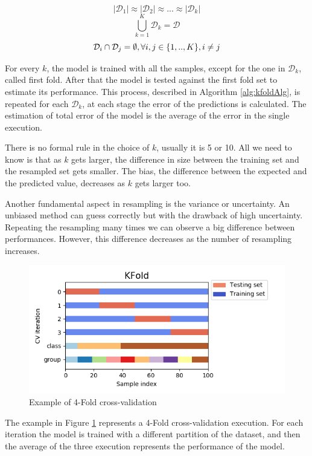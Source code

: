\[|\mathcal{D}_1| \approx |\mathcal{D}_2| \approx ... \approx |\mathcal{D}_k|
\]
\[
\bigcup_{k=1}^{K} \mathcal{D}_{k} = \mathcal{D}
\]
\[
 \mathcal{D}_i \cap \mathcal{D}_j = \emptyset, \space \forall i,j \in \{1, .., K \}, i \neq j
\]

For every $k$, the model is trained with all the samples, except for the one in $\mathcal{D}_k$, called first fold. After that the model is tested against the first fold set to estimate its performance. This process, described in Algorithm \ref{alg:kfoldAlg}, is repeated for each $\mathcal{D}_k$, at each stage the error of the predictions is calculated. The estimation of total error of the model is the average of the error in the single execution.

There is no formal rule in the choice of $k$, usually it is 5 or 10. All we need to know is that as $k$ gets larger, the difference in size between the training set and the resampled set gets smaller. The bias, the difference between the expected and the predicted value, decreases as $k$ gets larger too.

Another fundamental aspect in resampling is the variance or uncertainty. An unbiased method can guess correctly but with the drawback of high uncertainty. Repeating the resampling many times we can observe a big difference between performances. However, this difference decreases as the number of resampling increases.

\begin{figure}[!h]
	\centering
	\includegraphics[width=1.0\columnwidth]{kfold2}
	\caption{Example of 4-Fold cross-validation}
	\label{fig:kfold}
\end{figure}

The example in Figure \ref{fig:kfold} represents a 4-Fold cross-validation execution. For each iteration the model is trained with a different partition of the dataset, and then the average of the three execution represents the performance of the model.

